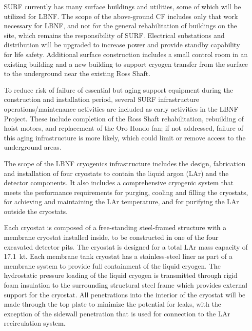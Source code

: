 SURF currently has many surface buildings and utilities, some of which will be utilized for LBNF. The scope of the above-ground CF includes only that work necessary for LBNF, and not for the general rehabilitation of buildings on the site, which remains the responsibility of SURF. 
Electrical substations and distribution will be upgraded to increase power and provide standby capability for life safety. Additional surface construction %
includes a small control room in an existing building and a new building to support cryogen transfer from the surface to the underground near the existing Ross Shaft.
 
To reduce risk of failure of essential but aging support equipment during the construction and installation period, several SURF infrastructure operations/maintenance activities are included as early activities in  the LBNF Project. These include completion of the Ross Shaft rehabilitation, rebuilding of hoist motors, and replacement of the Oro Hondo fan; if not addressed, %
failure of this aging infrastructure is more likely, which could limit or remove access to the underground areas.
 
The scope of the LBNF cryogenics infrastructure includes the design, fabrication and installation of four cryostats to contain the liquid argon (LAr) and the detector components. It also includes a comprehensive cryogenic system that meets the performance requirements for purging, cooling and filling the cryostats, for achieving and maintaining the LAr temperature, and for purifying the LAr outside the cryostats. 
 
Each cryostat is composed of a free-standing steel-framed structure with a membrane cryostat %
installed inside, to be constructed in one of the four excavated detector pits. The cryostat is designed for a total LAr mass capacity of 
17.1~kt. Each membrane tank cryostat has a stainless-steel liner as part of a %
membrane system to provide full containment of the liquid cryogen. The hydrostatic pressure loading of the liquid cryogen is transmitted through rigid foam insulation to the surrounding structural steel frame which provides external support for the cryostat.  All penetrations into the interior of the cryostat will be made through the top plate to minimize the potential for leaks, with the exception of the sidewall penetration that is used for connection to the LAr recirculation system.
 
